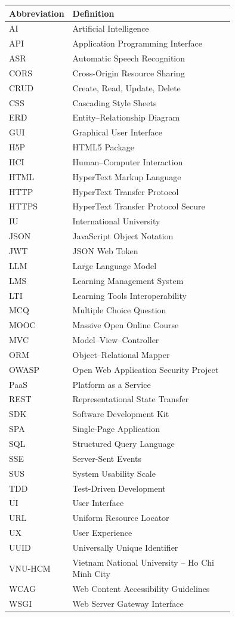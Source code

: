 \begin{longtable}{@{}lp{0.75\linewidth}@{}}
\toprule
\textbf{Abbreviation} & \textbf{Definition} \\
\midrule
\endhead
AI    & Artificial Intelligence \\
API   & Application Programming Interface \\
ASR   & Automatic Speech Recognition \\
CORS  & Cross-Origin Resource Sharing \\
CRUD  & Create, Read, Update, Delete \\
CSS   & Cascading Style Sheets \\
ERD   & Entity--Relationship Diagram \\
GUI   & Graphical User Interface \\
H5P   & HTML5 Package \\
HCI   & Human--Computer Interaction \\
HTML  & HyperText Markup Language \\
HTTP  & HyperText Transfer Protocol \\
HTTPS & HyperText Transfer Protocol Secure \\
IU    & International University \\
JSON  & JavaScript Object Notation \\
JWT   & JSON Web Token \\
LLM   & Large Language Model \\
LMS   & Learning Management System \\
LTI   & Learning Tools Interoperability \\
MCQ   & Multiple Choice Question \\
MOOC  & Massive Open Online Course \\
MVC   & Model--View--Controller \\
ORM   & Object--Relational Mapper \\
OWASP & Open Web Application Security Project \\
PaaS  & Platform as a Service \\
REST  & Representational State Transfer \\
SDK   & Software Development Kit \\
SPA   & Single-Page Application \\
SQL   & Structured Query Language \\
SSE   & Server-Sent Events \\
SUS   & System Usability Scale \\
TDD   & Test-Driven Development \\
UI    & User Interface \\
URL   & Uniform Resource Locator \\
UX    & User Experience \\
UUID  & Universally Unique Identifier \\
VNU-HCM & Vietnam National University -- Ho Chi Minh City \\
WCAG  & Web Content Accessibility Guidelines \\
WSGI  & Web Server Gateway Interface \\
\bottomrule
\end{longtable}
